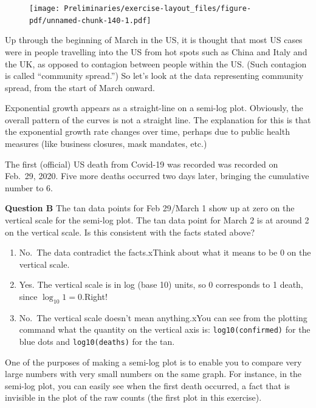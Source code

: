 \documentclass[
  letterpaper,
  DIV=11,
  numbers=noendperiod,
  oneside]{article}
\providecommand{\tightlist}{%
  \setlength{\itemsep}{0pt}\setlength{\parskip}{0pt}}\usepackage{longtable,booktabs,array}
\begin{document}
\begin{multicols}{2}
\begin{figure}[H]

{\centering \texttt{[image: Preliminaries/exercise-layout\_files/figure-pdf/unnamed-chunk-140-1.pdf]}

}

\end{figure}

Up through the beginning of March in the US, it is thought that most US
cases were in people travelling into the US from hot spots such as China
and Italy and the UK, as opposed to contagion between people within the
US. (Such contagion is called ``community spread.'') So let's look at
the data representing community spread, from the start of March onward.

Exponential growth appears as a straight-line on a semi-log plot.
Obviously, the overall pattern of the curves is not a straight line. The
explanation for this is that the exponential growth rate changes over
time, perhaps due to public health measures (like business closures,
mask mandates, etc.)

The first (official) US death from Covid-19 was recorded was recorded on
Feb.~29, 2020. Five more deaths occurred two days later, bringing the
cumulative number to 6.

\textbf{Question B} The tan data points for Feb 29/March 1 show up at
zero on the vertical scale for the semi-log plot. The tan data point for
March 2 is at around 2 on the vertical scale. Is this consistent with
the facts stated above?

\begin{enumerate}
\def\labelenumi{\roman{enumi}.}
\tightlist
\item
  {No.~The data contradict the facts.{xThink about what it means to be
  0 on the vertical scale.}}\\
\item
  {Yes. The vertical scale is in log (base 10) units, so 0 corresponds
  to 1 death, since \(\log_{10} 1 = 0\).{Right!~}}\\
\item
  {No.~The vertical scale doesn't mean anything.{xYou can see from the
  plotting command what the quantity on the vertical axis is:
  \texttt{log10(confirmed)} for the blue dots and \texttt{log10(deaths)}
  for the tan.}}
\end{enumerate}

One of the purposes of making a semi-log plot is to enable you to
compare very large numbers with very small numbers on the same graph.
For instance, in the semi-log plot, you can easily see when the first
death occurred, a fact that is invisible in the plot of the raw counts
(the first plot in this exercise).


\end{multicols}
\end{document}
